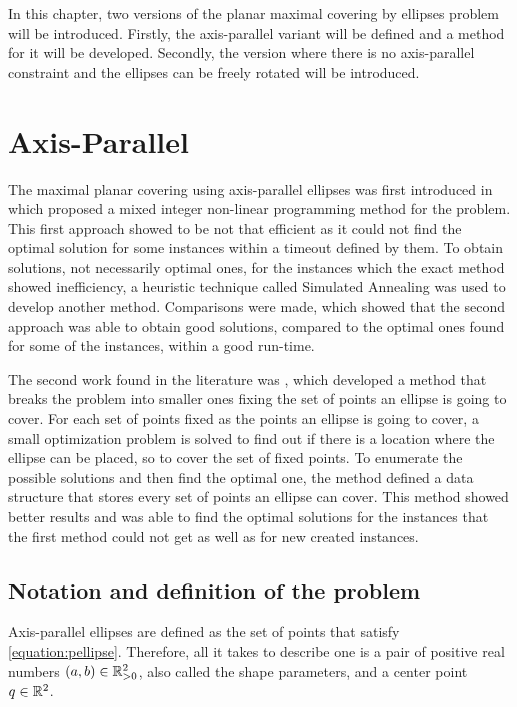 In this chapter, two versions of the planar maximal covering by ellipses problem will be introduced.
Firstly, the axis-parallel variant will be defined and a method for it will be developed. Secondly, the version where there is no axis-parallel constraint and the ellipses can be freely rotated will be introduced.

\section{Axis-Parallel}
The maximal planar covering using axis-parallel ellipses was first introduced in \cite{canbolat} which proposed a mixed integer non-linear programming method for the problem. This first approach showed to be not that efficient as it could not find the optimal solution for some instances within a timeout defined by them. To obtain solutions, not necessarily optimal ones, for the instances which the exact method showed inefficiency, a heuristic technique called Simulated Annealing was used to develop another method. Comparisons were made, which showed that the second approach was able to obtain good solutions, compared to the optimal ones found for some of the instances, within a good run-time.

The second work found in the literature was \cite{andreta}, which developed a method that breaks the problem into smaller ones fixing the set of points an ellipse is going to cover. For each set of points fixed as the points an ellipse is going to cover, a small optimization problem is solved to find out if there is a location where the ellipse can be placed, so to cover the set of fixed points. To enumerate the possible solutions and then find the optimal one, the method defined a data structure that stores every set of points an ellipse can cover. This method showed better results and was able to find the optimal solutions for the instances that the first method could not get as well as for new created instances.

\subsection{Notation and definition of the problem}

Axis-parallel ellipses are defined as the set of points that satisfy \autoref{equation:pellipse}. Therefore, all it takes to describe one is a pair of positive real numbers $(a,b) \in \mathbb{R}_{>0}^2$, also called the shape parameters, and a center point $q \in \mathbb{R}^2$. 

